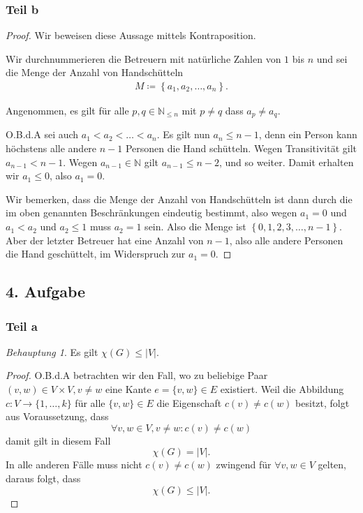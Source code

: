 \documentclass[a5paper]{article}
\providecommand{\abs}[1]{\left\lvert#1\right\rvert}
\theoremstyle{remark}
\newtheorem*{Behauptung}{Behauptung}
\begin{document}
\subsubsection{Teil b}
\begin{proof}
  Wir beweisen diese Aussage mittels Kontraposition.

  Wir durchnummerieren die Betreuern mit natürliche Zahlen von \(1\) bis
  \(n\) und sei die Menge der Anzahl von Handschütteln
\begin{align*}
M\coloneq \left\{ a_1, a_2, \ldots, a_n \right\}.
\end{align*}

Angenommen, es gilt für alle \(p,q \in \mathbb{N}_{\leq n}\) mit $p \neq
q$ dass \(a_p \neq a_q\).

O.B.d.A sei auch \(a_1 < a_2 < \ldots < a_n\).  Es gilt nun $a_n \leq n
- 1$, denn ein Person kann höchstens alle andere \(n-1\) Personen die
Hand schütteln.  Wegen Transitivität gilt \(a_{n-1} < n - 1\).  Wegen
\(a_{n-1} \in \mathbb{N}\) gilt \(a_{n-1} \leq n-2\), und so weiter.
Damit erhalten wir \(a_1 \leq 0\), also \(a_1 = 0\).

Wir bemerken, dass die Menge der Anzahl von Handschütteln ist dann
durch die im oben genannten Beschränkungen eindeutig bestimmt, also
wegen \(a_1=0\) und \(a_1 < a_2\) und \(a_2 \leq 1\) muss \(a_2 = 1\) sein.
Also die Menge ist \(\left\{ 0, 1, 2, 3, \ldots, n-1 \right\}\).  Aber
der letzter Betreuer hat eine Anzahl von \(n-1\), also alle andere
Personen die Hand geschüttelt, im Widerspruch zur \(a_1=0\).
\end{proof}
\subsection{4. Aufgabe}
\subsubsection{Teil a}
\begin{Behauptung}
  Es gilt \(\chi(G) \le \abs{V}\).
\end{Behauptung}
\begin{proof}
  O.B.d.A betrachten wir den Fall, wo zu beliebige Paar
  \((v, w) \in V \times V, v \ne w\) eine Kante \(e = \{v, w\} \in E\) existiert.
  Weil die Abbildung \(c\colon V \to \{1, \ldots, k\}\) für alle \(\{v, w\} \in E\) die
  Eigenschaft \(c(v) \ne c(w)\) besitzt, folgt aus Voraussetzung, dass
  \[\forall v, w \in V, v \ne w\colon c(v) \ne c(w)\]
  damit gilt in diesem Fall
  \[\chi(G) = \abs{V}.\]
  In alle anderen Fälle muss nicht \(c(v) \ne c(w)\) zwingend für
  \(\forall v, w \in V\) gelten, daraus folgt, dass
  \[\chi(G) \le \abs{V}.\]
\end{proof}
\end{document}
